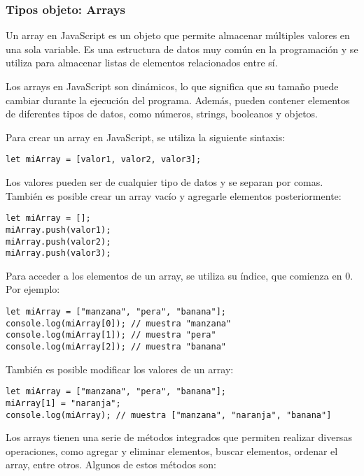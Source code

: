 \documentclass[executivepaper]{article}
\begin{document}
\subsubsection*{Tipos objeto: Arrays}

Un array en JavaScript es un objeto que permite almacenar múltiples valores en una sola variable. Es una estructura de datos muy común en la programación y se utiliza para almacenar listas de elementos relacionados entre sí.

Los arrays en JavaScript son dinámicos, lo que significa que su tamaño puede cambiar durante la ejecución del programa. Además, pueden contener elementos de diferentes tipos de datos, como números, strings, booleanos y objetos.

Para crear un array en JavaScript, se utiliza la siguiente sintaxis:

\begin{lstlisting}
let miArray = [valor1, valor2, valor3];
\end{lstlisting}

Los valores pueden ser de cualquier tipo de datos y se separan por comas. También es posible crear un array vacío y agregarle elementos posteriormente:

\begin{lstlisting}
let miArray = [];
miArray.push(valor1);
miArray.push(valor2);
miArray.push(valor3);
\end{lstlisting}

Para acceder a los elementos de un array, se utiliza su índice, que comienza en 0. Por ejemplo:

\begin{lstlisting}
let miArray = ["manzana", "pera", "banana"];
console.log(miArray[0]); // muestra "manzana"
console.log(miArray[1]); // muestra "pera"
console.log(miArray[2]); // muestra "banana"
\end{lstlisting}

También es posible modificar los valores de un array:

\begin{lstlisting}
let miArray = ["manzana", "pera", "banana"];
miArray[1] = "naranja";
console.log(miArray); // muestra ["manzana", "naranja", "banana"]
\end{lstlisting}

Los arrays tienen una serie de métodos integrados que permiten realizar diversas operaciones, como agregar y eliminar elementos, buscar elementos, ordenar el array, entre otros. Algunos de estos métodos son:
\end{document}
